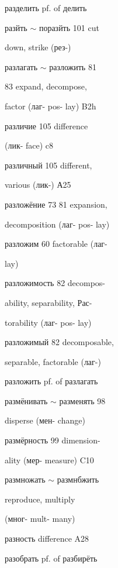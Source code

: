 \clearpage
\thispagestyle{plain}
\begingroup
\cyrillicfont
\fontsize{7.25}{8.25}\selectfont
\setlength{\parindent}{0pt}
\setlength{\parskip}{0pt}
\setlength{\emergencystretch}{1.5em}
\noindent
\begin{minipage}[t]{0.475\textwidth}
\raggedright
\noindent разделить pf. of делить\par
\noindent разйть $\sim$ поразйть 101 cut\par
\noindent down, strike (рез-)\par
\noindent разлагать $\sim$ разложить 81\par
{} 83 expand, decompose,\par
\noindent factor (лаг- pos- lay) B2h\par
\noindent различие 105 difference\par
\noindent (лик- face) c8\par
\noindent различный 105 different,\par
\noindent various (лик-) А25\par
\noindent разложёние 73 81 expansion,\par
\noindent decomposition (лаг- pos- lay)\par
\noindent разложим 60 factorable (лаг-\par
\noindent lay)\par
\noindent разложимость 82 decompos-\par
\noindent ability, separability, Рас-\par
\noindent torability (лаг- pos- lay)\par
\noindent разложимый 82 decomposable,\par
\noindent separable, factorable (лаг-)\par
\noindent разложить pf. of разлагать\par
\noindent размёнивать $\sim$ разменять 98\par
\noindent disperse (мен- change)\par
\noindent размёрность 99 dimension-\par
\noindent ality (мер- measure) C10\par
\noindent размножать $\sim$ размнбжить\par
{} reproduce, multiply\par
\noindent (мног- mult- many)\par
\noindent разность difference A28\par
\noindent разобрать pf. of разбирёть\par

\end{minipage}
